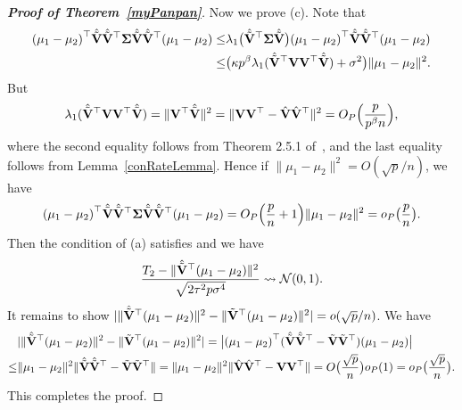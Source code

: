\documentclass[times,sort&compress,3p]{elsarticle}
\theoremstyle{plain}
\theoremstyle{definition}
\theoremstyle{remark}
\begin{document}
\begin{appendices}
\begin{proof}[\textbf{Proof of Theorem~\ref{myPanpan}}]
Now we prove (c).
    Note that
    \begin{equation*}
        \begin{aligned}
             {(\mu_1-\mu_2)}^\top  \hat{\tilde{\mathbf{V}}}\hat{\tilde{\mathbf{V}}}^\top \boldsymbol{\Sigma} \hat{\tilde{\mathbf{V}}}\hat{\tilde{\mathbf{V}}}^\top (\mu_1-\mu_2)
            \leq &
             \lambda_1\big(\hat{\tilde{\mathbf{V}}}^\top \boldsymbol{\Sigma} \hat{\tilde{\mathbf{V}}}\big) {(\mu_1-\mu_2)}^\top  \hat{\tilde{\mathbf{V}}}\hat{\tilde{\mathbf{V}}}^\top (\mu_1-\mu_2)\\
            \leq & 
             \big(\kappa p^{\beta}\lambda_1(\hat{\tilde{\mathbf{V}}}^\top  \mathbf{V}\mathbf{V}^\top   \hat{\tilde{\mathbf{V}}})+\sigma^2\big)
             \|\mu_1-\mu_2\|^2.
        \end{aligned}
    \end{equation*}
    But
    \begin{equation*}
        \begin{aligned}
\lambda_1(\hat{\tilde{\mathbf{V}}}^\top  \mathbf{V}\mathbf{V}^\top   \hat{\tilde{\mathbf{V}}})
=\|\mathbf{V}^\top   \hat{\tilde{\mathbf{V}}}\|^2
            = \|\mathbf{V}\mathbf{V}^\top -\hat{\mathbf{V}}\hat{\mathbf{V}}^\top \|^2=O_P\Big(\frac{p}{p^{\beta}n}\Big),
        \end{aligned}
    \end{equation*}
    where the second equality follows from Theorem 2.5.1 of~\cite{matrixComputations}, and the last equality follows from Lemma~\ref{conRateLemma}. 
Hence if $\|\mu_1-\mu_2\|^2=O(\sqrt{p}/n)$, we have
$$
             {(\mu_1-\mu_2)}^\top  \hat{\tilde{\mathbf{V}}}\hat{\tilde{\mathbf{V}}}^\top \boldsymbol{\Sigma} \hat{\tilde{\mathbf{V}}}\hat{\tilde{\mathbf{V}}}^\top (\mu_1-\mu_2)=O_P\Big(\frac{p}{n}+1\Big)\|\mu_1-\mu_2\|^2=o_P\big(\frac{p}{n}\big).
$$
Then the condition of (a) satisfies and we have
$$
\frac{T_2-\|\hat{\tilde{\mathbf{V}}}^\top  (\mu_1-\mu_2)\|^2}{\sqrt{2\tau^2 p \sigma^4}}
\rightsquigarrow \mathcal{N}(0,1).
$$
It remains to show
$
|\|\hat{\tilde{\mathbf{V}}}^\top  (\mu_1-\mu_2)\|^2
-\|\tilde{\mathbf{V}}^\top  (\mu_1-\mu_2)\|^2|
=o(\sqrt{p}/n)
$.
    We have
    \begin{equation*}
        \begin{aligned}
            &|\|\hat{\tilde{\mathbf{V}}}^\top  (\mu_1-\mu_2)\|^2-\|\tilde{\mathbf{V}}^\top  (\mu_1-\mu_2)\|^2|=
            \big|{(\mu_1-\mu_2)}^\top (\hat{\tilde{\mathbf{V}}}\hat{\tilde{\mathbf{V}}}^\top -\tilde{\mathbf{V}}\tilde{\mathbf{V}}^\top )(\mu_1-\mu_2)\big|\\
            \leq &
            \|\mu_1-\mu_2\|^2 \|\hat{\tilde{\mathbf{V}}}\hat{\tilde{\mathbf{V}}}^\top -\tilde{\mathbf{V}}\tilde{\mathbf{V}}^\top \|
            = 
            \|\mu_1-\mu_2\|^2  \|\hat{\mathbf{V}}\hat{\mathbf{V}}^\top -\mathbf{V}\mathbf{V}^\top \|
            =O\big(\frac{\sqrt{p}}{n}\big)o_P(1)=o_P\big(\frac{\sqrt{p}}{n}\big).
        \end{aligned}
    \end{equation*}
This completes the proof.
\end{proof}


\end{appendices}
\end{document}
